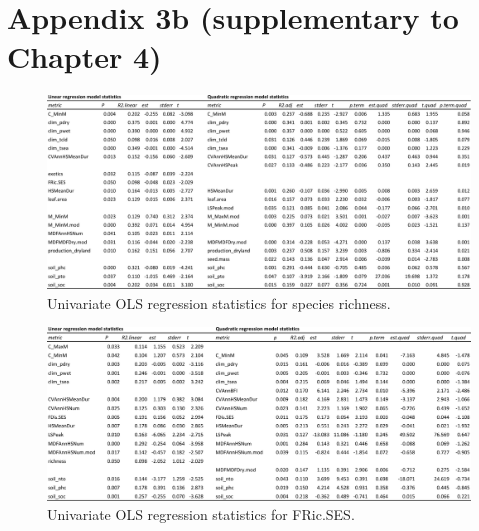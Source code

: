\chapter[Appendix 3b]{Appendix 3b (supplementary to Chapter 4)}

\begin{landscape}
\begin{figure}[h!]
\begin{center}
\includegraphics[width=24cm]{S2a.pdf} %
\caption[Univariate OLS regression statistics for species richness.]{\small{Univariate OLS regression statistics for species richness.}} %
\label{fig:Ch4sup2_F1} %
\end{center}
\end{figure}   
\end{landscape}
\clearpage

\begin{landscape}
\begin{figure}[h!]
\begin{center}
\includegraphics[width=24cm]{S2b.pdf} %
\caption[Univariate OLS regression statistics for FRic.SES.]{\small{Univariate OLS regression statistics for FRic.SES.}} %
\label{fig:Ch4sup2_F1} %
\end{center}
\end{figure}   
\end{landscape}
\clearpage

